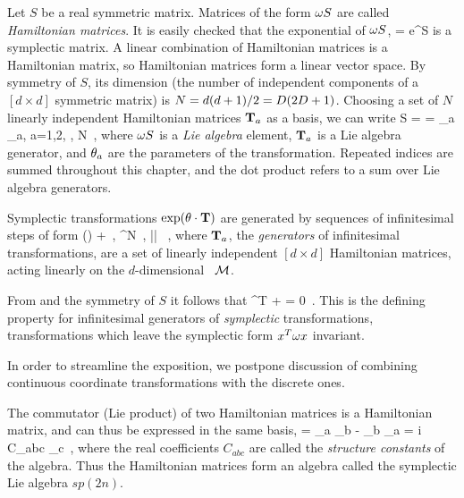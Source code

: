 Let $S$ be a real symmetric matrix. Matrices of the form ${\bf \omega}S$ are
called \emph{Hamiltonian matrices}. It is easily checked that
the exponential of
${\bf \omega}S$,
\beq
\LieEl = e^{{\bf \omega}S}
is a symplectic matrix.
A linear combination  of
Hamiltonian matrices is a Hamiltonian matrix, so
Hamiltonian matrices form a linear vector space. By symmetry of
$S$, its dimension (the number of independent components of a
$[\!d\times\! d]$ symmetric matrix) is
$N= d(d+1)/2 = D(2D+1)$. Choosing a set of $N$ linearly
independent Hamiltonian matrices $\mathbf{T}_a$ as a basis, we
can write
\beq
{\bf \omega}S
 = \gSpace \cdot \Lg  = \sum \gSpace_a \Lg_a,\; a=1,2, \cdots, N
\,,
where ${\bf \omega}S$
is a {\em Lie algebra} element,  $\mathbf{T}_a$ is a Lie algebra generator,
and $\theta_a$ are the parameters
of the transformation. Repeated indices are summed throughout this
chapter, and the dot product refers to a sum over
Lie algebra generators.

{Symplectic} transformations $ \exp(\theta \cdot {\ensuremath{\mathbf{T}}}) $ are
generated by sequences of infinitesimal steps of form
\beq
\LieEl(\delta\gSpace)  + \delta \gSpace \cdot \Lg
    \,,\quad
\delta\gSpace \in \reals^N
    \,,\quad
|\delta \gSpace| 
    \, ,
where $\mathbf{T}_a$, the {\em generators} of infinitesimal
transformations, are a set of linearly independent
$[d\!\times\!d]$ Hamiltonian matrices,
acting linearly on the $d$-dim\-ens\-ion\-al
\statesp\ ${\cal M}$.

From
 and
the symmetry of $S$
it follows that
\beq
 \Lg^T {\bf \omega} + {\bf \omega} \Lg = 0
\,.
This is the defining property for
infinitesimal generators of {\em symplectic}
transformations,
transformations which leave
the symplectic form $x^T {\bf \omega} x$ invariant.

In order to streamline the exposition, we
postpone discussion of combining continuous coordinate
transformations with the discrete ones.

The commutator (Lie product) of two Hamiltonian matrices is a Hamiltonian
matrix, and can thus be expressed in the same basis,
\beq
[\Lg_a, \Lg_b]
	=
\Lg_a \Lg_b - \Lg_b \Lg_a
	=
i C_{abc} \Lg_c
\,,
where the real coefficients $C_{abc}$ are called the \emph{structure
constants} of the algebra. Thus the Hamiltonian matrices form an algebra
called the symplectic Lie algebra $sp(2n)$.

